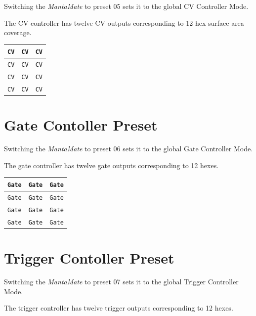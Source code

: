   Switching the \emph{MantaMate} to preset 05 sets it to the global
  CV Controller Mode.

  The CV controller has twelve CV outputs corresponding to 12 hex surface
  area coverage.

  \begin{center}
  \begin{tabular}{ | m{1.5cm} | m{1.5cm}| m{1.5cm} | }
    \hline
    \texttt{CV} & \texttt{CV} & \texttt{CV} \\
    \hline
    \texttt{CV} & \texttt{CV} & \texttt{CV} \\
    \hline
    \texttt{CV} & \texttt{CV} & \texttt{CV} \\
    \hline
    \texttt{CV} & \texttt{CV} & \texttt{CV} \\
    \hline
  \end{tabular}
  \end{center}

\section{Gate Contoller Preset}

  Switching the \emph{MantaMate} to preset 06 sets it to the global
  Gate Controller Mode.

  The gate controller has twelve gate outputs corresponding to 12 hexes.

  \begin{center}
  \begin{tabular}{ | m{1.5cm} | m{1.5cm}| m{1.5cm} | }
    \hline
    \texttt{Gate} & \texttt{Gate} & \texttt{Gate} \\
    \hline
    \texttt{Gate} & \texttt{Gate} & \texttt{Gate} \\
    \hline
    \texttt{Gate} & \texttt{Gate} & \texttt{Gate} \\
    \hline
    \texttt{Gate} & \texttt{Gate} & \texttt{Gate} \\
    \hline
  \end{tabular}
  \end{center}

  \section{Trigger Contoller Preset}

    Switching the \emph{MantaMate} to preset 07 sets it to the global
    Trigger Controller Mode.

    The trigger controller has twelve trigger outputs corresponding to 12 hexes.

